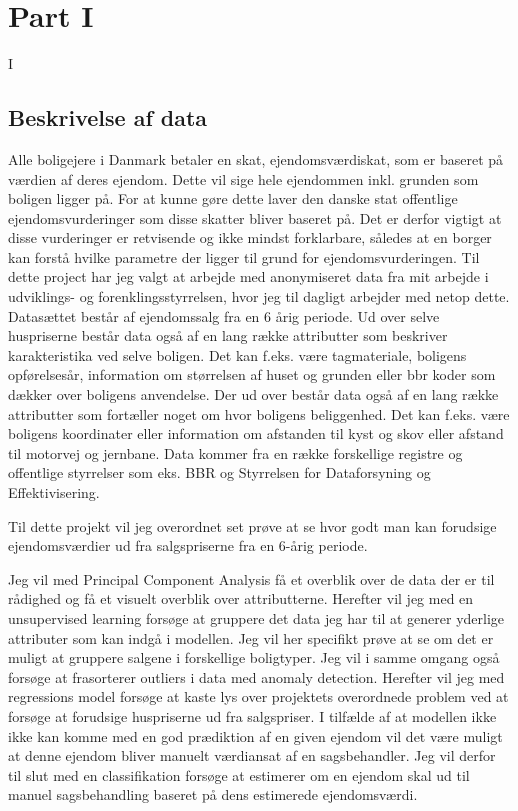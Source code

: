 \documentclass{report}
\title{}
\author{Anna Louise Hansen}
\begin{document}



\pagebreak



\chapter{Part I} I

\section{Beskrivelse af data}
Alle boligejere i Danmark betaler en skat, ejendomsværdiskat, som er baseret på værdien af deres ejendom. Dette vil sige hele ejendommen inkl. grunden som boligen ligger på. For at kunne gøre dette laver den danske stat offentlige ejendomsvurderinger som disse skatter bliver baseret på. 
Det er derfor vigtigt at disse vurderinger er retvisende og ikke mindst forklarbare, således at en borger kan forstå hvilke parametre der ligger til grund for ejendomsvurderingen. 
Til dette project har jeg valgt at arbejde med anonymiseret data fra mit arbejde i udviklings- og forenklingsstyrrelsen, hvor jeg til dagligt arbejder med netop dette. Datasættet består af ejendomssalg fra en 6 årig periode. Ud over selve huspriserne består data også af en lang række attributter som beskriver karakteristika ved selve boligen. Det kan f.eks. være tagmateriale, boligens opførelsesår, information om størrelsen af huset og grunden eller bbr koder som dækker over boligens anvendelse. 
Der ud over består data også af en lang række attributter som fortæller noget om hvor boligens beliggenhed. Det kan f.eks. være boligens koordinater eller information om afstanden til kyst og skov eller afstand til motorvej og jernbane. 
Data kommer fra en række forskellige registre og offentlige styrrelser som eks. BBR og Styrrelsen for Dataforsyning og Effektivisering.

Til dette projekt vil jeg overordnet set prøve at se hvor godt man kan forudsige ejendomsværdier ud fra salgspriserne fra en 6-årig periode. 

Jeg vil med Principal Component Analysis få et overblik over de data der er til rådighed og få et visuelt overblik over attributterne. 
Herefter vil jeg med en unsupervised learning forsøge at gruppere det data jeg har til at generer yderlige attributer som kan indgå i modellen. Jeg vil her specifikt prøve at se om det er muligt at gruppere salgene i forskellige boligtyper. Jeg vil i samme omgang også forsøge at frasorterer outliers i data med anomaly detection. 
Herefter vil jeg med regressions model forsøge at kaste lys over projektets overordnede problem ved at forsøge at forudsige huspriserne ud fra salgspriser. I tilfælde af at modellen ikke ikke kan komme med en god prædiktion af en given ejendom vil det være muligt at denne ejendom bliver manuelt værdiansat af en sagsbehandler. Jeg vil derfor til slut med en classifikation forsøge at estimerer om en ejendom skal ud til manuel sagsbehandling baseret på dens estimerede ejendomsværdi.
\end{document}
